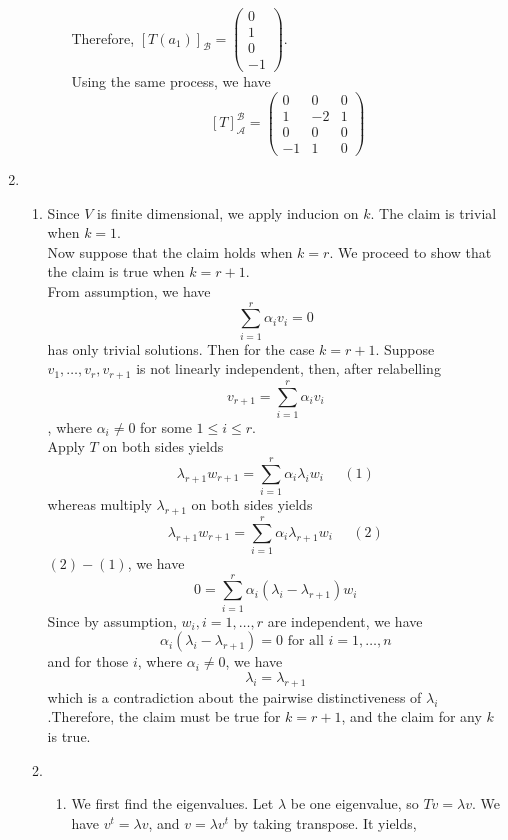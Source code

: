 \documentclass[12pt]{article}
\theoremstyle{definition}
\begin{document}
\begin{enumerate}
\begin{enumerate}
\begin{enumerate}
\[  \]
  Therefore, $[T(a_1)]_\mathcal{B} = \begin{pmatrix}0\\1\\0\\-1\end{pmatrix}$.\\
  Using the same process, we have
  \[
[T]_\mathcal{A}^\mathcal{B}=\begin{pmatrix}0&0&0\\1&-2&1\\0&0&0\\-1&1&0\end{pmatrix}
  \]
        \end{enumerate}
\end{enumerate}
\item 
\begin{enumerate}
  \item Since $V$ is finite dimensional, we apply inducion on $k$. The claim is trivial when $k = 1$.\\Now suppose that the claim holds when $k = r$. We proceed to show that the claim is true when $k = r+1$.\\
  From assumption, we have
  \[
\sum_{i=1}^r \alpha_iv_i = 0
  \]
  has only trivial solutions. Then for the case $k = r+1$. Suppose $v_1,\ldots, v_r,v_{r+1}$ is not linearly independent, then, after relabelling
  \[
v_{r+1} = \sum_{i=1}^r \alpha_i v_i
  \], where $\alpha_i\neq 0$ for some $1\leq i\leq r$.\\Apply $T$ on both sides yields
  \[
\lambda_{r+1}w_{r+1}=\sum_{i=1}^r \alpha_i\lambda_iw_i\;\;\;\;\;(1)
  \]
  whereas multiply $\lambda_{r+1}$ on both sides yields
  \[
\lambda_{r+1}w_{r+1}=\sum_{i=1}^r \alpha_i\lambda_{r+1}w_i\;\;\;\;\;(2)
  \]
  $(2)-(1)$, we have
  \[
0 =\sum_{i=1}^r\alpha_i(\lambda_i-\lambda_{r+1})w_i
  \]
  Since by assumption, $w_i, i = 1,\ldots, r$ are independent, we have
  \[
\alpha_i(\lambda_i-\lambda_{r+1})= 0 \text{ for all }i = 1,\ldots, n 
  \]
  and for those $i$, where $\alpha_i\neq 0$, we have
  \[
\lambda_i = \lambda_{r+1}
  \]
  which is a contradiction about the pairwise distinctiveness of $\lambda_i$.Therefore, the claim must be true for $k=r+1$, and the claim for any $k$ is true.
  \item \begin{enumerate}
  \item We first find the eigenvalues. Let $\lambda$ be one eigenvalue, so $Tv = \lambda v$. We have $v^t = \lambda v$, and $v = \lambda v^t$ by taking transpose. It yields,

\end{enumerate}
\end{enumerate}
\end{enumerate}
\end{document}
